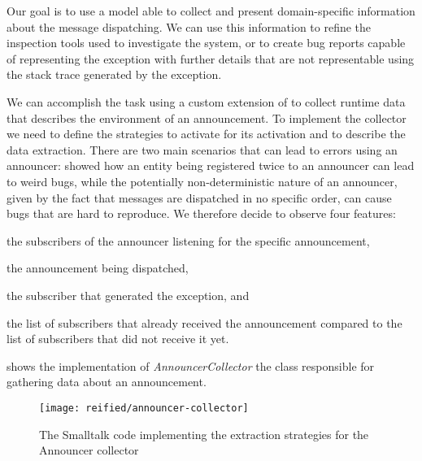  Our goal is to use a model able to collect and present domain-specific information about the message dispatching.
We can use this information to refine the inspection tools used to investigate the system, or to create bug reports capable of representing the exception with further details that are not representable using the stack trace generated by the exception.

We can accomplish the task using a custom extension of \sln to collect runtime data that describes the environment of an announcement. To implement the collector we need to define the strategies to activate for its activation and to describe the data extraction.
There are two main scenarios that can lead to errors using an announcer:  showed how an entity being registered twice to an announcer can lead to weird bugs, while the potentially non-deterministic nature of an announcer, given by the fact that messages are dispatched in no specific order, can cause bugs that are hard to reproduce.
We therefore decide to observe four features:
%
\begin{inparaenum}[(1)]
  \item the subscribers of the announcer listening for the specific announcement,
  \item the announcement being dispatched,
  \item the subscriber that generated the exception, and
  \item the list of subscribers that already received the announcement compared to the list of subscribers that did not receive it yet.
\end{inparaenum}
%
 shows the implementation of \textit{AnnouncerCollector} the class responsible for gathering data about an announcement.

\begin{figure}[h]
\centering 
\texttt{[image: reified/announcer-collector]}
\caption{The Smalltalk code implementing the extraction strategies for the Announcer collector}
\label{fig:announcer-code}
\end{figure}

